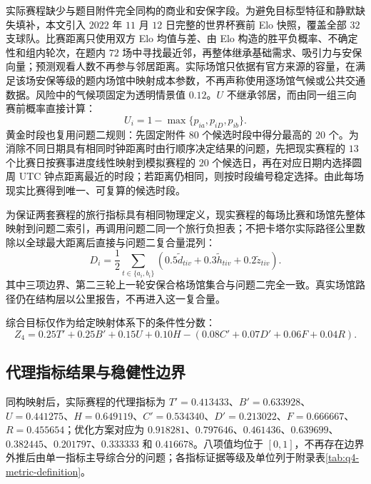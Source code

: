 实际赛程缺少与题目附件完全同构的商业和安保字段。为避免目标型特征和静默缺失填补，本文引入 $2022$ 年 $11$ 月 $12$ 日完整的世界杯赛前 Elo 快照，覆盖全部 $32$ 支球队。比赛距离只使用双方 Elo 均值与差、由 Elo 构造的胜平负概率、不确定性和组内轮次，在题内 $72$ 场中寻找最近邻，再整体继承基础需求、吸引力与安保向量；预测观看人数不再参与邻居距离。实际场馆只依据有官方来源的容量，在满足该场安保等级的题内场馆中映射成本参数，不再声称使用逐场馆气候或公共交通数据。风险中的气候项固定为透明情景值 $0.12$。$U$ 不继承邻居，而由同一组三向赛前概率直接计算：
\begin{equation}
U_i=1-\max\{p_{ia},p_{iD},p_{ib}\}.
\end{equation}
黄金时段也复用问题二规则：先固定附件 $80$ 个候选时段中得分最高的 $20$ 个。为消除不同日期具有相同时钟距离时由行顺序决定结果的问题，先把现实赛程的 $13$ 个比赛日按赛事进度线性映射到模拟赛程的 $20$ 个候选日，再在对应日期内选择圆周 UTC 钟点距离最近的时段；若距离仍相同，则按时段编号稳定选择。由此每场现实比赛得到唯一、可复算的候选时段。

为保证两套赛程的旅行指标具有相同物理定义，现实赛程的每场比赛和场馆先整体映射到问题二索引，再调用问题二同一个旅行负担表；不把卡塔尔实际路径公里数除以全球最大距离后直接与问题二复合量混列：
\begin{equation}
D_i=\frac{1}{2}\sum_{t\in\{a_i,b_i\}}
\left(0.5\widetilde d_{tiv}+0.3\widetilde h_{tiv}+0.2\widetilde z_{tiv}\right).
\end{equation}
其中三项边界、第二三轮上一轮安保合格场馆集合与问题二完全一致。真实场馆路径仍在结构层以公里报告，不再进入这一复合量。

综合目标仅作为给定映射体系下的条件性分数：
\begin{equation}
Z_4=0.25T'+0.25B'+0.15U+0.10H-
\left(0.08C'+0.07D'+0.06F+0.04R\right).
\end{equation}

\subsection{代理指标结果与稳健性边界}

同构映射后，实际赛程的代理指标为 $T'=0.413433$、$B'=0.633928$、$U=0.441275$、$H=0.649119$、$C'=0.534340$、$D'=0.213022$、$F=0.666667$、$R=0.455654$；优化方案对应为 $0.918281$、$0.797646$、$0.461436$、$0.639699$、$0.382445$、$0.201797$、$0.333333$ 和 $0.416678$。八项值均位于 $[0,1]$，不再存在边界外推后由单一指标主导综合分的问题；各指标证据等级及单位列于附录表\ref{tab:q4-metric-definition}。

